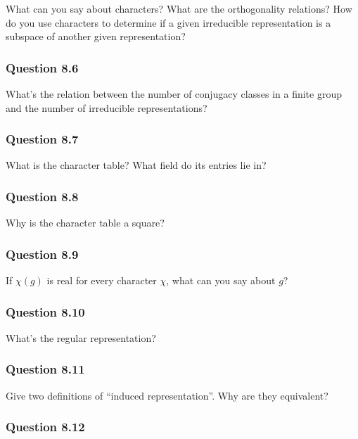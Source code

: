 What can you say about characters? What are the orthogonality relations?
How do you use characters to determine if a given irreducible
representation is a subspace of another given representation?

\hypertarget{question-8.6}{%
\subsubsection{Question 8.6}\label{question-8.6}}

What's the relation between the number of conjugacy classes in a finite
group and the number of irreducible representations?

\hypertarget{question-8.7}{%
\subsubsection{Question 8.7}\label{question-8.7}}

What is the character table? What field do its entries lie in?

\hypertarget{question-8.8}{%
\subsubsection{Question 8.8}\label{question-8.8}}

Why is the character table a square?

\hypertarget{question-8.9}{%
\subsubsection{Question 8.9}\label{question-8.9}}

If \(\chi(g)\) is real for every character \(\chi\), what can you say
about \(g\)?

\hypertarget{question-8.10}{%
\subsubsection{Question 8.10}\label{question-8.10}}

What's the regular representation?

\hypertarget{question-8.11}{%
\subsubsection{Question 8.11}\label{question-8.11}}

Give two definitions of ``induced representation''. Why are they
equivalent?

\hypertarget{question-8.12}{%
\subsubsection{Question 8.12}\label{question-8.12}}

